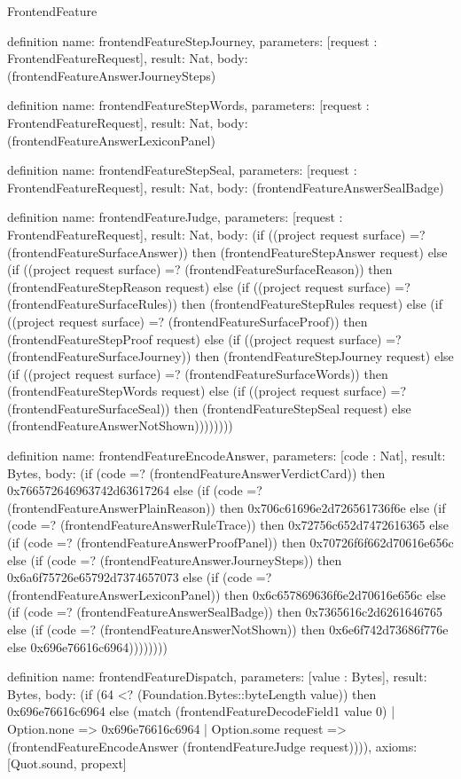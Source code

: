 \begin{lexlean}{FrontendFeature}
\begin{semanticmodule}
definition{
  name: frontendFeatureStepJourney,
  parameters: [request : FrontendFeatureRequest],
  result: Nat,
  body: (frontendFeatureAnswerJourneySteps)
}

definition{
  name: frontendFeatureStepWords,
  parameters: [request : FrontendFeatureRequest],
  result: Nat,
  body: (frontendFeatureAnswerLexiconPanel)
}

definition{
  name: frontendFeatureStepSeal,
  parameters: [request : FrontendFeatureRequest],
  result: Nat,
  body: (frontendFeatureAnswerSealBadge)
}

definition{
  name: frontendFeatureJudge,
  parameters: [request : FrontendFeatureRequest],
  result: Nat,
  body: (if ((project request surface) =? (frontendFeatureSurfaceAnswer)) then (frontendFeatureStepAnswer request) else (if ((project request surface) =? (frontendFeatureSurfaceReason)) then (frontendFeatureStepReason request) else (if ((project request surface) =? (frontendFeatureSurfaceRules)) then (frontendFeatureStepRules request) else (if ((project request surface) =? (frontendFeatureSurfaceProof)) then (frontendFeatureStepProof request) else (if ((project request surface) =? (frontendFeatureSurfaceJourney)) then (frontendFeatureStepJourney request) else (if ((project request surface) =? (frontendFeatureSurfaceWords)) then (frontendFeatureStepWords request) else (if ((project request surface) =? (frontendFeatureSurfaceSeal)) then (frontendFeatureStepSeal request) else (frontendFeatureAnswerNotShown))))))))
}

definition{
  name: frontendFeatureEncodeAnswer,
  parameters: [code : Nat],
  result: Bytes,
  body: (if (code =? (frontendFeatureAnswerVerdictCard)) then 0x766572646963742d63617264 else (if (code =? (frontendFeatureAnswerPlainReason)) then 0x706c61696e2d726561736f6e else (if (code =? (frontendFeatureAnswerRuleTrace)) then 0x72756c652d7472616365 else (if (code =? (frontendFeatureAnswerProofPanel)) then 0x70726f6f662d70616e656c else (if (code =? (frontendFeatureAnswerJourneySteps)) then 0x6a6f75726e65792d7374657073 else (if (code =? (frontendFeatureAnswerLexiconPanel)) then 0x6c657869636f6e2d70616e656c else (if (code =? (frontendFeatureAnswerSealBadge)) then 0x7365616c2d6261646765 else (if (code =? (frontendFeatureAnswerNotShown)) then 0x6e6f742d73686f776e else 0x696e76616c6964))))))))
}

definition{
  name: frontendFeatureDispatch,
  parameters: [value : Bytes],
  result: Bytes,
  body: (if (64 <? (Foundation.Bytes::byteLength value)) then 0x696e76616c6964 else (match (frontendFeatureDecodeField1 value 0)
    | Option.none => 0x696e76616c6964
    | Option.some request => (frontendFeatureEncodeAnswer (frontendFeatureJudge request)))),
  axioms: [Quot.sound, propext]
}
\end{semanticmodule}
\end{lexlean}
